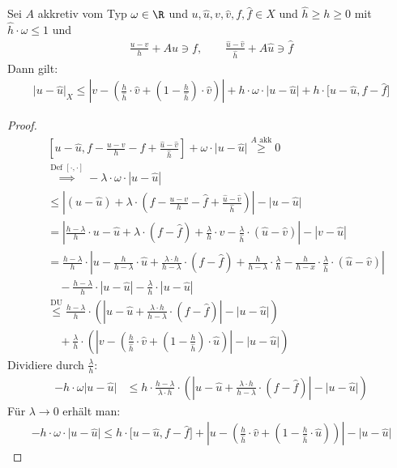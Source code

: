 \begin{lemma}
Sei $A$ akkretiv vom Typ $\omega\in\R$ und $u,\hat{u},v,\hat{v},f,\hat{f}\in X$ und $\hat{h}\geq h\geq 0$ mit $\hat{h}\cdot\omega\leq 1$ und 
\begin{align*}
\frac{u-v}{h}+Au\ni f,\qquad\frac{\hat{u}-\hat{v}}{\hat{h}}+A\hat{u}\ni\hat{f}
\end{align*}
Dann gilt:
\begin{align*}
\big|u-\hat{u}\big|_X\leq\left|v-\left(\frac{h}{\hat{h}}\cdot\hat{v}+\left(1-\frac{h}{\hat{h}}\right)\cdot\hat{v}\right)\right|+h\cdot\omega\cdot\big|u-\hat{u}\big|+h\cdot\big[ u-\hat{u},f-\hat{f}\big]
\end{align*}
\end{lemma}
\begin{proof} %
\begin{align*}
&\left[u-\hat{u},f-\frac{u-v}{h}-\hat{f}+\frac{\hat{u}-\hat{v}}{\hat{h}}\right]+\omega\cdot\big|u-\hat{u}\big|\stackrel{A\text{ akk}}{\geq} 0\\
&\stackrel{\text{Def }[\cdot,\cdot]}{\implies}
-\lambda\cdot\omega\cdot|u-\hat{u}|\\
&\leq\left|(u-\hat{u})+\lambda\cdot\left(f-\frac{u-v}{h}-\hat{f}+\frac{\hat{u}-\hat{v}}{\hat{h}}\right)\right|-\big|u-\hat{u}\big|\\
&=
\left|\frac{h-\lambda}{h}\cdot u-\hat{u}+\lambda\cdot(f-\hat{f})+\frac{\lambda}{h}\cdot v-\frac{\lambda}{\hat{h}}\cdot(\hat{u}-\hat{v})\right|-|v-\hat{u}|\\
&=\frac{h-\lambda}{h}\cdot\left|u-\frac{h}{h-\lambda}\cdot\hat{u}+\frac{\lambda\cdot h}{h-\lambda}\cdot(f-\hat{f})+\frac{h}{h-\lambda}\cdot\frac{\lambda}{h}
-\frac{h}{h-x}\cdot\frac{\lambda}{\hat{h}}\cdot(\hat{u}-\hat{v})\right|\\
&\quad-\frac{h-\lambda}{h}\cdot|u-\hat{u}|-\frac{\lambda}{h}\cdot|u-\hat{u}|\\
&\stackrel{\text{DU}}{\leq}
\frac{h-\lambda}{h}\cdot\left(\left|u-\hat{u}+\frac{\lambda\cdot h}{h-\lambda}\cdot(f-\hat{f})\right|-\big|u-\hat{u}\big|\right)\\
&\quad+\frac{\lambda}{h}\cdot\left(\left|v-\left(\frac{h}{\hat{h}}\cdot\hat{v}+\left(1-\frac{h}{\hat{h}}\right)\cdot\hat{u}\right)\right|-\big|u-\hat{u}\big|\right)
\end{align*}
Dividiere durch $\frac{\lambda}{h}$:
\begin{align*}
-h\cdot\omega\big|u-\hat{u}\big|
&\leq h\cdot\frac{h-\lambda}{\lambda\cdot h}\cdot\left(\left|u-\hat{u}+\frac{\lambda\cdot h}{h-\lambda}\cdot(f-\hat{f})\right|-\big|u-\hat{u}\big|\right)
\end{align*}
Für $\lambda\to0$ erhält man:
\begin{align*}
-h\cdot\omega\cdot\big|u-\hat{u}\big|\leq h\cdot\big[u-\hat{u},f-\hat{f}\big]+\left|u-\left(\frac{h}{\hat{h}}\cdot\hat{v}+\left(1-\frac{h}{\hat{h}}\cdot\hat{u}\right)\right)\right|-\big|u-\hat{u}\big|
\end{align*}
\end{proof}

